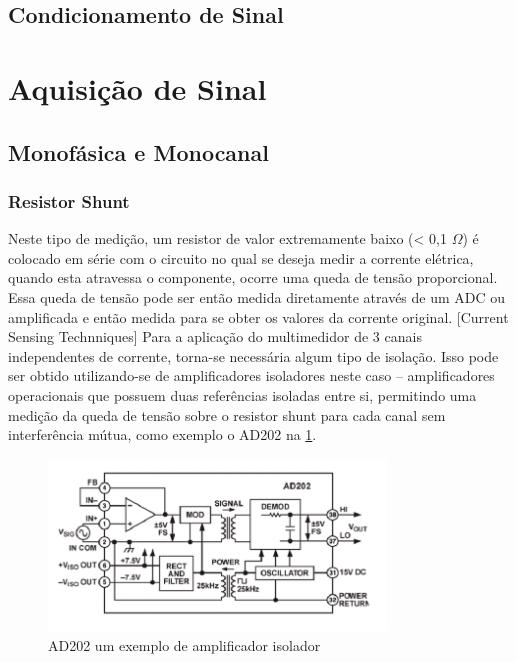 \subsection{Condicionamento de Sinal}\label{sec:SignalConditioning}



\section{Aquisição de Sinal}\label{sec:aqSignal}

    \subsection{Monofásica e Monocanal}\label{subsec:aqSMono}

        \subsubsection{Resistor Shunt}\label{subsubsec:resiShunt}
            Neste tipo de medição, um resistor de valor extremamente baixo (< 0,1 $\Omega$) é colocado em série com o circuito no qual se deseja medir a corrente elétrica, quando esta atravessa o componente, ocorre uma queda de tensão proporcional. Essa queda de tensão pode ser então medida diretamente através de um ADC ou amplificada e então medida para se obter os valores da corrente original. [Current Sensing Technniques]
            Para a aplicação do multimedidor de 3 canais independentes de corrente, torna-se necessária algum tipo de isolação. Isso pode ser obtido utilizando-se de amplificadores isoladores neste caso – amplificadores operacionais que possuem duas referências isoladas entre si, permitindo uma medição da queda de tensão sobre o resistor shunt para cada canal sem interferência mútua, como exemplo o AD202 na \ref{AD202}.
            \begin{figure}[htb]
                \caption{AD202 um exemplo de amplificador isolador}
                \label{AD202}
                \includegraphics[width=0.8\textwidth]{figuras/AD202-ampop-isolado.png}
            \end{figure}

